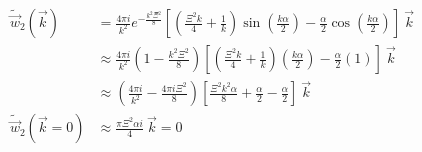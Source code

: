 \documentclass[double,12pt]{beavtex}
\begin{document}
\begin{align}
   \widetilde{\vec{w}}_2(\vec{k})&= \frac{4\pi{i}}{k^2}
   e^{-\frac{k^2\Xi^2}{8}}
   \left[\left(\frac{\Xi^2k}{4}+\frac{1}{k}\right)\sin\left(
   \frac{k\alpha}{2}\right)
   -\frac{\alpha}{2}\cos\left(\frac{k\alpha}{2}\right)\right]
   {~}\vec{k} \\
    & \approx  \frac{4\pi{i}}{k^2}\left(1-\frac{k^2\Xi^2}{8}\right)
    \left[\left(\frac{\Xi^2k}{4}+\frac{1}{k}\right)\left(\frac{k\alpha}
    {2}\right)-\frac{\alpha}{2}\left(1\right)\right]{~}\vec{k}\\
    & \approx  \left(\frac{4\pi{i}}{k^2}-\frac{4\pi i\Xi^2}{8}\right)
    \left[\frac{\Xi^2k^2\alpha}{8}+\frac{\alpha}{2}-\frac{\alpha}{2}
    \right]{~}\vec{k} \\
    \widetilde{\vec w}_2(\vec k=0) & \approx \frac{\pi\Xi^2\alpha i}{4} 
    {~}\vec{k} = 0
\end{align}
\end{document}
